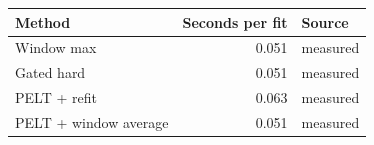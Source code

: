 \begin{tabular}{lrl}
\toprule
Method & Seconds per fit & Source \\
\midrule
Window max & 0.051 & measured \\
Gated hard & 0.051 & measured \\
PELT + refit & 0.063 & measured \\
PELT + window average & 0.051 & measured \\
\bottomrule
\end{tabular}
